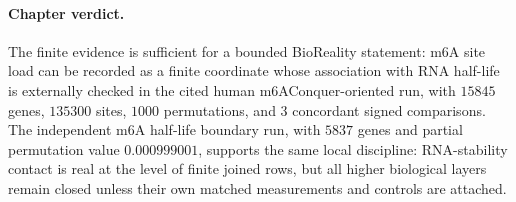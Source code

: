 \paragraph{Chapter verdict.}
The finite evidence is sufficient for a bounded BioReality statement: m6A site load can be recorded as a finite coordinate whose association with RNA half-life is externally checked in the cited human m6AConquer-oriented run, with $15845$ genes, $135300$ sites, $1000$ permutations, and $3$ concordant signed comparisons.  The independent m6A half-life boundary run, with $5837$ genes and partial permutation value $0.000999001$, supports the same local discipline: RNA-stability contact is real at the level of finite joined rows, but all higher biological layers remain closed unless their own matched measurements and controls are attached.